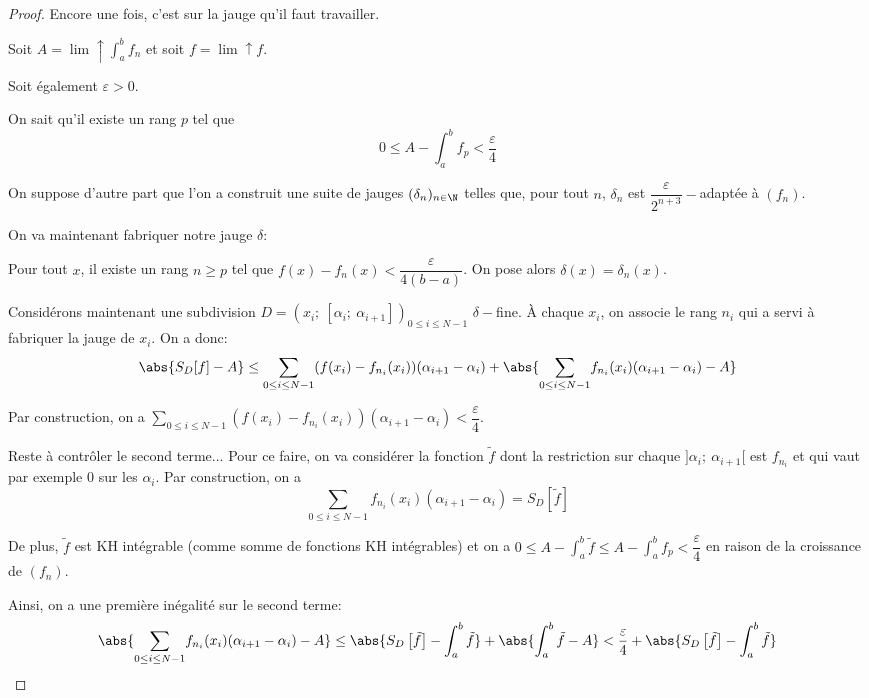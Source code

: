 \begin{proof}
Encore une fois, c'est sur la jauge qu'il faut travailler.

Soit $A = \lim \uparrow \int_a^b f_n$ et soit $f = \lim \uparrow f$. 

Soit également $\varepsilon>0$. 

On sait qu'il existe un rang $p$ tel que 
\[
0 \leq A - \int_a^b f_p < \dfrac{\varepsilon}{4}
\]

On suppose d'autre part que l'on a construit une suite de jauges $(\delta_n)_{n \in \N}$ telles que, pour tout $n$, $\delta_n$ est $\dfrac{\varepsilon}{2^{n+3}}-$adaptée à $(f_n)$.

On va maintenant fabriquer notre jauge $\delta$:

Pour tout $x$, il existe un rang $n \geq p$ tel que $f(x)-f_n(x) < \dfrac{\varepsilon}{4(b-a)}$. On pose alors $\delta(x) = \delta_n(x)$.

Considérons maintenant une subdivision $D=(x_i;~[\alpha_i;~\alpha_{i+1}])_{0 \leq i \leq N-1}$ $\delta-$fine. À chaque $x_i$, on associe le rang $n_i$ qui a servi à fabriquer la jauge de $x_i$.
On a donc:
\[
\abs{S_D[f]-A} \leq \displaystyle{\sum \limits_{0 \leq i \leq N-1}} (f(x_i)-f_{n_i}(x_i)) (\alpha_{i+1}-\alpha_i) + \abs{\displaystyle{\sum \limits_{0 \leq i \leq N-1}} f_{n_i}(x_i)(\alpha_{i+1}-\alpha_i) - A}
\]

Par construction, on a $\displaystyle{\sum \limits_{0 \leq i \leq N-1}} (f(x_i)-f_{n_i}(x_i)) (\alpha_{i+1}-\alpha_i) < \dfrac{\varepsilon}{4}$. 

Reste à contrôler le second terme... Pour ce faire, on va considérer la fonction $\tilde{f}$ dont la restriction sur chaque $]\alpha_i;~\alpha_{i+1}[$ est $f_{n_i}$ et qui vaut par exemple $0$ sur les $\alpha_i$. Par construction, on a
\[
\displaystyle{\sum \limits_{0 \leq i \leq N-1}} f_{n_i}(x_i)(\alpha_{i+1}-\alpha_i) = S_D\left [ \tilde{f}\right ]
\]


De plus, $\tilde{f}$ est KH intégrable (comme somme de fonctions KH intégrables) et on a $0 \leq A-\int_a^b \tilde{f} \leq A-\int_a^b f_p < \dfrac{\varepsilon}{4}$ en raison de la croissance de $(f_n)$.

Ainsi, on a une première inégalité sur le second terme:
\[
\abs{\displaystyle{\sum \limits_{0 \leq i \leq N-1}} f_{n_i}(x_i)(\alpha_{i+1}-\alpha_i) - A} \leq \abs{S_D\left [ \tilde{f}\right ]-\int_a^b \tilde{f}} + \abs{\int_a^b \tilde{f} - A} < \dfrac{\varepsilon}{4} + \abs{S_D\left [ \tilde{f}\right ]-\int_a^b \tilde{f}}
\]


\end{proof}
